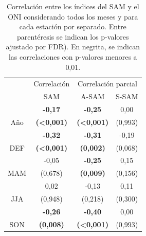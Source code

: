 \documentclass[12pt,oneside,a4paper]{reedthesis}
\begin{document}
\begin{table}

\caption{\label{tab:enso-cor-table}Correlación entre los índices del SAM y el ONI considerando todos los meses y para cada estación por separado. Entre parentéresis se indican los p-valores ajustado por FDR). En negrita, se indican las correlaciones con p-valores menores a 0,01.}
\centering
\begin{tabular}[t]{c>{}c>{}c>{}c}
\toprule
\multicolumn{1}{c}{ } & \multicolumn{1}{c}{Correlación} & \multicolumn{2}{c}{Correlación parcial} \\
\cmidrule(l{3pt}r{3pt}){2-2} \cmidrule(l{3pt}r{3pt}){3-4}
 & SAM & A-SAM & S-SAM\\
\midrule
 & \textbf{-0,17} & \textbf{-0,25} & 0,00\\
\cmidrule{2-4}
\multirow[t]{-2}{*}{\centering\arraybackslash Año} & \textbf{(<0,001)} & \textbf{(<0,001)} & (0,993)\\
\cmidrule{1-4}
 & \textbf{-0,32} & \textbf{-0,31} & -0,19\\
\cmidrule{2-4}
\multirow[t]{-2}{*}{\centering\arraybackslash DEF} & \textbf{(<0,001)} & \textbf{(0,002)} & (0,068)\\
\cmidrule{1-4}
 & -0,05 & \textbf{-0,25} & 0,15\\
\cmidrule{2-4}
\multirow[t]{-2}{*}{\centering\arraybackslash MAM} & (0,678) & \textbf{(0,009)} & (0,156)\\
\cmidrule{1-4}
 & 0,02 & -0,13 & 0,11\\
\cmidrule{2-4}
\multirow[t]{-2}{*}{\centering\arraybackslash JJA} & (0,948) & (0,218) & (0,300)\\
\cmidrule{1-4}
 & \textbf{-0,26} & \textbf{-0,40} & 0,00\\
\cmidrule{2-4}
\multirow[t]{-2}{*}{\centering\arraybackslash SON} & \textbf{(0,008)} & \textbf{(<0,001)} & (0,993)\\
\bottomrule
\end{tabular}
\end{table}
\end{document}
